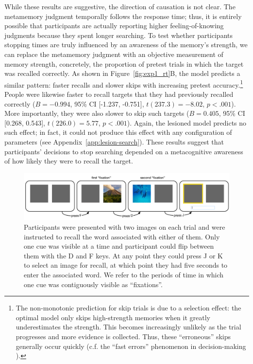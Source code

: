 While these results are suggestive, the direction of causation is not clear. The metamemory judgment temporally follows the response time; thus, it is entirely possible that participants are actually reporting higher feeling-of-knowing judgments because they spent longer searching. To test whether participants stopping times are truly influenced by an awareness of the memory's strength, we can replace the metamemory judgment with an objective measurement of memory strength, concretely, the proportion of pretest trials in which the target was recalled correctly. As shown in Figure~\ref{fig:exp1_rt}B, the model predicts a similar pattern: faster recalls and slower skips with increasing pretest accuracy.\footnote{%
    The non-monotonic prediction for skip trials is due to a selection effect: the optimal model only skips high-strength memories when it greatly underestimates the strength. This becomes increasingly unlikely as the trial progresses and more evidence is collected. Thus, these ``erroneous'' skips generally occur quickly (c.f. the ``fast errors'' phenomenon in decision-making  \citealp{ratcliff1998modeling}).
    }
People were likewise faster to recall targets that they had previously recalled correctly ($B = -0.994$, 95\% CI [-1.237, -0.751], $t(237.3)=-8.02$, $p < .001$). More importantly, they were also slower to skip such targets ($B = 0.405$, 95\% CI [0.268, 0.543], $t(226.0)=5.77$, $p < .001$). Again, the lesioned model predicts no such effect; in fact, it could not produce this effect with any configuration of parameters (see Appendix~\ref{app:lesion-search}). These results suggest that participants' decisions to stop searching depended on a metacognitive awareness of how likely they were to recall the target.

\begin{figure}[ht!]
  \centering
  \includegraphics[width=\textwidth]{figs/memory/task_exp2.pdf}
  \caption{ Participants were presented with two images on each trial and were instructed to recall the word associated with either of them. Only one cue was visible at a time and participant could flip between them with the D and F keys. At any point they could press J or K to select an image for recall, at which point they had five seconds to enter the associated word. We refer to the periods of time in which one cue was contiguously visible as ``fixations''.}
  \label{fig:task-exp2}
\end{figure}

